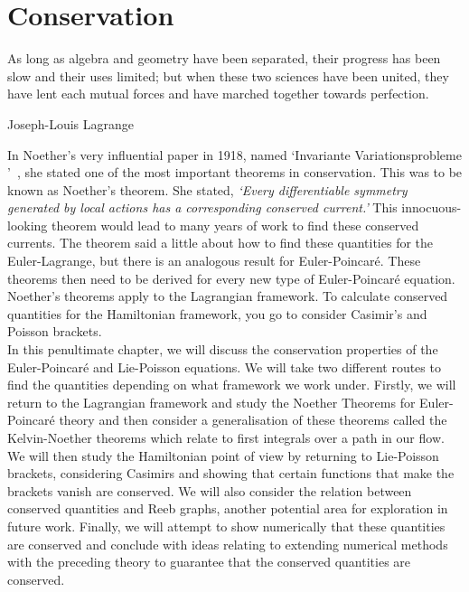 
\chapter{Conservation}
\epigraph{As long as algebra and geometry have been separated, their progress has been slow and their uses limited; but when these two sciences have been united, they have lent each mutual forces and have marched together towards perfection.}{Joseph-Louis Lagrange}

\noindent
In Noether's very influential paper in 1918, named `Invariante Variationsprobleme '~\cite {Noether1918}, she stated one of the most important theorems in conservation. This was to be known as Noether's theorem. She stated, \textit{`Every differentiable symmetry generated by local actions has a corresponding conserved current.'} This innocuous-looking theorem would lead to many years of work to find these conserved currents. The theorem said a little about how to find these quantities for the Euler-Lagrange, but there is an analogous result for Euler-Poincar\'e. These theorems then need to be derived for every new type of Euler-Poincar\'e equation. Noether's theorems apply to the Lagrangian framework. To calculate conserved quantities for the Hamiltonian framework, you go to consider Casimir's and Poisson brackets.\\

\noindent
In this penultimate chapter, we will discuss the conservation properties of the Euler-Poincar\'e and Lie-Poisson equations. We will take two different routes to find the quantities depending on what framework we work under. Firstly, we will return to the Lagrangian framework and study the Noether Theorems for Euler-Poincar\'e theory and then consider a generalisation of these theorems called the Kelvin-Noether theorems which relate to first integrals over a path in our flow. We will then study the Hamiltonian point of view by returning to Lie-Poisson brackets, considering Casimirs and showing that certain functions that make the brackets vanish are conserved. We will also consider the relation between conserved quantities and Reeb graphs, another potential area for exploration in future work. Finally, we will attempt to show numerically that these quantities are conserved and conclude with ideas relating to extending numerical methods with the preceding theory to guarantee that the conserved quantities are conserved.

